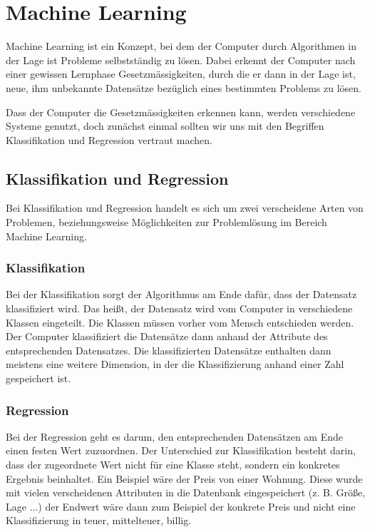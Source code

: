 \section{Machine Learning}
\author{Farhadiba Mohammed, Dennis Kempf, David Steinmann}
Machine Learning ist ein Konzept, bei dem der Computer durch Algorithmen in der Lage ist Probleme selbstständig zu lösen. Dabei erkennt der Computer nach einer gewissen Lernphase Gesetzmässigkeiten, durch die er dann in der Lage ist, neue, ihm unbekannte Datensätze bezüglich eines bestimmten Problems zu lösen.

Dass der Computer die Gesetzmässigkeiten erkennen kann, werden verschiedene Systeme genutzt, doch zunächst einmal sollten wir uns mit den Begriffen Klassifikation und Regression vertraut machen.


\subsection{Klassifikation und Regression}
\author{David Steinmann}
Bei Klassifikation und Regression handelt es sich um zwei verscheidene Arten von Problemen, beziehungsweise Möglichkeiten zur Problemlösung im Bereich Machine Learning.

\subsubsection{Klassifikation}
Bei der Klassifikation sorgt der Algorithmus am Ende dafür, dass der Datensatz klassifiziert wird. Das heißt, der Datensatz wird vom Computer in verschiedene Klassen eingeteilt. Die Klassen müssen vorher vom Mensch entschieden werden. Der Computer klassifiziert die Datensätze dann anhand der Attribute des entsprechenden Datensatzes. Die klassifizierten Datensätze enthalten dann meistens eine weitere Dimension, in der die Klassifizierung anhand einer Zahl gespeichert ist.

\subsubsection{Regression}
Bei der Regression geht es darum, den entsprechenden Datensätzen am Ende einen festen Wert zuzuordnen. Der Unterschied zur Klassifikation besteht darin, dass der zugeordnete Wert nicht für eine Klasse steht, sondern ein konkretes Ergebnis beinhaltet. Ein Beispiel wäre der Preis von einer Wohnung. Diese wurde mit vielen verscheidenen Attributen in die Datenbank eingespeichert (z. B. Größe, Lage ...) der Endwert wäre dann zum Beispiel der konkrete Preis und nicht eine Klassifizierung in \glqq teuer\grqq , \glqq mittelteuer\grqq , \glqq billig\grqq . 

